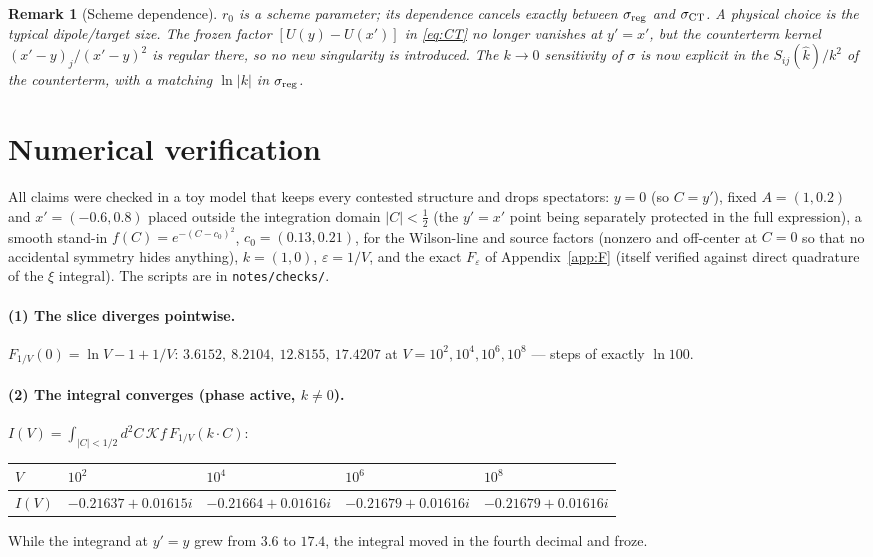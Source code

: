 \documentclass[11pt]{article}
\newtheorem{remark}{Remark}
\newcommand{\bA}{A}
\newcommand{\bC}{C}
\newcommand{\khat}{\hat k}
\begin{document}
\begin{remark}[Scheme dependence]
$r_0$ is a scheme parameter; its dependence cancels exactly between
$\sigma_{\rm reg}$ and $\sigma_{\rm CT}$.  A physical choice is the
typical dipole/target size.  The frozen factor $[U(y)-U(x')]$ in
\eqref{eq:CT} no longer vanishes at $y'=x'$, but the counterterm kernel
$(x'-y)_j/(x'-y)^2$ is regular there, so no new singularity is
introduced.  The $k\to0$ sensitivity of $\sigma$ is now explicit in the
$S_{ij}(\khat)/k^{2}$ of the counterterm, with a matching $\ln|k|$ in
$\sigma_{\rm reg}$.
\end{remark}

\section{Numerical verification}
\label{sec:numerics}

All claims were checked in a toy model that keeps every contested
structure and drops spectators: $y=0$ (so $\bC=y'$), fixed
$\bA=(1,0.2)$ and $x'=(-0.6,0.8)$ placed outside the integration domain
$|\bC|<\tfrac12$ (the $y'=x'$ point being separately protected in the
full expression), a smooth stand-in
$f(\bC)=e^{-(\bC-c_0)^2}$, $c_0=(0.13,0.21)$, for the Wilson-line and
source factors (nonzero and off-center at $\bC=0$ so that no accidental
symmetry hides anything), $k=(1,0)$, $\varepsilon=1/V$, and the exact
$F_\varepsilon$ of Appendix~\ref{app:F} (itself verified against direct
quadrature of the $\xi$ integral).  The scripts are in
\texttt{notes/checks/}.

\paragraph{(1) The slice diverges pointwise.}
$F_{1/V}(0)=\ln V-1+1/V$: $3.6152,\ 8.2104,\ 12.8155,\ 17.4207$ at
$V=10^{2},10^{4},10^{6},10^{8}$ --- steps of exactly $\ln100$.

\paragraph{(2) The integral converges (phase active, $k\ne0$).}
$I(V)=\int_{|\bC|<1/2}d^2\bC\,\mathcal K f\,F_{1/V}(k\cdot\bC)$:
\begin{center}
\begin{tabular}{lllll}
\toprule
$V$ & $10^{2}$ & $10^{4}$ & $10^{6}$ & $10^{8}$\\
\midrule
$I(V)$ & $-0.21637+0.01615i$ & $-0.21664+0.01616i$
       & $-0.21679+0.01616i$ & $-0.21679+0.01616i$\\
\bottomrule
\end{tabular}
\end{center}
While the integrand at $y'=y$ grew from $3.6$ to $17.4$, the integral
moved in the fourth decimal and froze.
\end{document}
